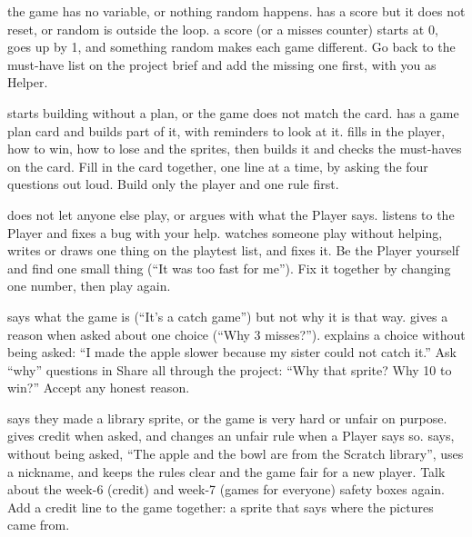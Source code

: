   {the game has no variable, or nothing random happens.}
  {has a score but it does not reset, or random is outside the loop.}
  {a score (or a misses counter) starts at 0, goes up by 1, and something random makes each game different.}
  {Go back to the must-have list on the project brief and add the missing one first, with you as Helper.}

  {starts building without a plan, or the game does not match the card.}
  {has a game plan card and builds part of it, with reminders to look at it.}
  {fills in the player, how to win, how to lose and the sprites, then builds it and checks the must-haves on the card.}
  {Fill in the card together, one line at a time, by asking the four questions out loud. Build only the player and one rule first.}

  {does not let anyone else play, or argues with what the Player says.}
  {listens to the Player and fixes a bug with your help.}
  {watches someone play without helping, writes or draws one thing on the playtest list, and fixes it.}
  {Be the Player yourself and find one small thing (\enquote{It was too fast for me}). Fix it together by changing one number, then play again.}

  {says what the game is (\enquote{It's a catch game}) but not why it is that way.}
  {gives a reason when asked about one choice (\enquote{Why 3 misses?}).}
  {explains a choice without being asked: \enquote{I made the apple slower because my sister could not catch it.}}
  {Ask \enquote{why} questions in Share all through the project: \enquote{Why that sprite? Why 10 to win?} Accept any honest reason.}

  {says they made a library sprite, or the game is very hard or unfair on purpose.}
  {gives credit when asked, and changes an unfair rule when a Player says so.}
  {says, without being asked, \enquote{The apple and the bowl are from the Scratch library}, uses a nickname, and keeps the rules clear and the game fair for a new player.}
  {Talk about the week-6 (credit) and week-7 (games for everyone) safety boxes again. Add a credit line to the game together: a sprite that says where the pictures came from.}

